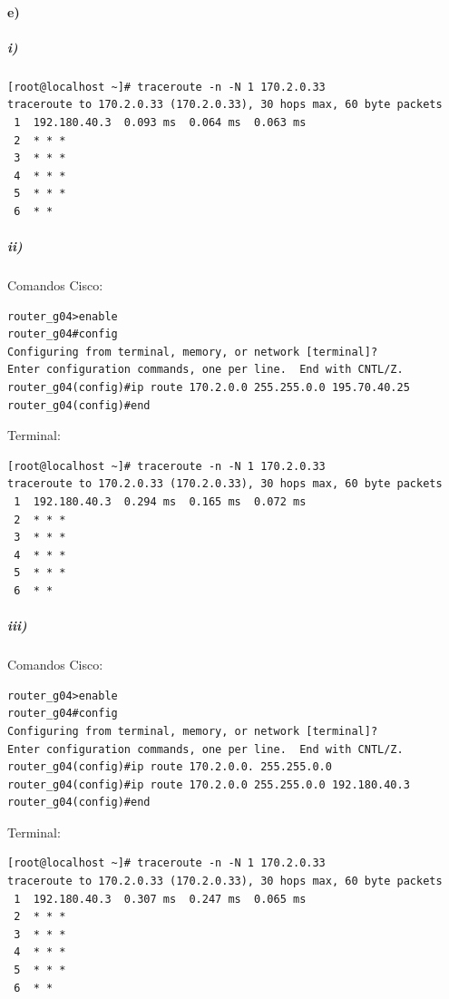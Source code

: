 \paragraph{e)}
\subparagraph{i)}
\begin{verbatim}
[root@localhost ~]# traceroute -n -N 1 170.2.0.33
traceroute to 170.2.0.33 (170.2.0.33), 30 hops max, 60 byte packets
 1  192.180.40.3  0.093 ms  0.064 ms  0.063 ms                                                             
 2  * * *                                                                
 3  * * *                                                                
 4  * * *                                                                
 5  * * *                                                                
 6  * *
\end{verbatim}
\subparagraph{ii)}
Comandos Cisco:
\begin{verbatim}
router_g04>enable
router_g04#config
Configuring from terminal, memory, or network [terminal]? 
Enter configuration commands, one per line.  End with CNTL/Z.
router_g04(config)#ip route 170.2.0.0 255.255.0.0 195.70.40.25
router_g04(config)#end
\end{verbatim}
Terminal:
\begin{verbatim}
[root@localhost ~]# traceroute -n -N 1 170.2.0.33
traceroute to 170.2.0.33 (170.2.0.33), 30 hops max, 60 byte packets
 1  192.180.40.3  0.294 ms  0.165 ms  0.072 ms                                                             
 2  * * *                                                                
 3  * * *                                                                
 4  * * *                                                                
 5  * * *                                                                
 6  * *
\end{verbatim}
\subparagraph{iii)}
Comandos Cisco:
\begin{verbatim}
router_g04>enable
router_g04#config
Configuring from terminal, memory, or network [terminal]? 
Enter configuration commands, one per line.  End with CNTL/Z.
router_g04(config)#ip route 170.2.0.0. 255.255.0.0
router_g04(config)#ip route 170.2.0.0 255.255.0.0 192.180.40.3 
router_g04(config)#end
\end{verbatim}
Terminal:
\begin{verbatim}
[root@localhost ~]# traceroute -n -N 1 170.2.0.33
traceroute to 170.2.0.33 (170.2.0.33), 30 hops max, 60 byte packets
 1  192.180.40.3  0.307 ms  0.247 ms  0.065 ms  
 2  * * *                                                                
 3  * * *                                                                
 4  * * *                                                                
 5  * * *                                                                
 6  * *
\end{verbatim}

